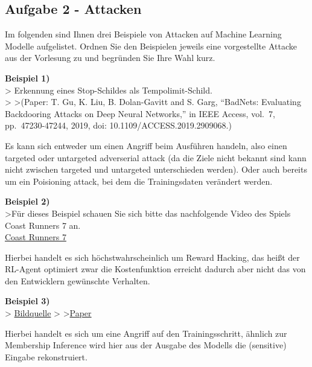 \documentclass[11pt]{article}
\begin{document}
    \hypertarget{aufgabe-2---attacken}{%
\subsection{Aufgabe 2 - Attacken}\label{aufgabe-2---attacken}}

Im folgenden sind Ihnen drei Beispiele von Attacken auf Machine Learning
Modelle aufgelistet. Ordnen Sie den Beispielen jeweils eine vorgestellte
Attacke aus der Vorlesung zu und begründen Sie Ihre Wahl kurz.

\textbf{Beispiel 1)}\\
\textgreater{} Erkennung eines Stop-Schildes als Tempolimit-Schild.\\
\textgreater{} \textgreater{}(Paper: T. Gu, K. Liu, B. Dolan-Gavitt and
S. Garg, ``BadNets: Evaluating Backdooring Attacks on Deep Neural
Networks,'' in IEEE Access, vol.~7, pp.~47230-47244, 2019, doi:
10.1109/ACCESS.2019.2909068.)

Es kann sich entweder um einen Angriff beim Ausführen handeln, also
einen targeted oder untargeted adverserial attack (da die Ziele nicht
bekannt sind kann nicht zwischen targeted und untargeted unterschieden
werden). Oder auch bereits um ein Poisioning attack, bei dem die
Trainingsdaten verändert werden.

\textbf{Beispiel 2)}\\
\textgreater{}Für dieses Beispiel schauen Sie sich bitte das
nachfolgende Video des Spiels Coast Runners 7 an.\\
\href{https://www.youtube.com/watch?time_continue=1\&v=tlOIHko8ySg}{Coast
Runners 7}

Hierbei handelt es sich höchstwahrscheinlich um Reward Hacking, das
heißt der RL-Agent optimiert zwar die Kostenfunktion erreicht dadurch
aber nicht das von den Entwicklern gewünschte Verhalten.

\textbf{Beispiel 3)}\\
\textgreater{}%
\href{https://d3i71xaburhd42.cloudfront.net/02bc27c39eaaa6b85d336be81b15ca19f112a950/2-Figure1-1.png}{Bildquelle}
\textgreater{}
\textgreater{}\href{https://dl.acm.org/doi/pdf/10.1145/2810103.2813677}{Paper}

Hierbei handelt es sich um eine Angriff auf den Trainingsschritt,
ähnlich zur Membership Inference wird hier aus der Ausgabe des Modells
die (sensitive) Eingabe rekonstruiert.
\end{document}
